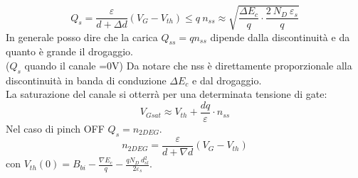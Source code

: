 \begin{equation}
    Q_s = \dfrac{\varepsilon}{d+\Delta d} (V_G - V_{th}) \leq q\ n_{ss} \approx \sqrt{\dfrac{\Delta E_c}{q} \cdot \dfrac{2\ N_D\ \varepsilon_s}{q}}
\end{equation}
In generale posso dire che la carica $Q_{ss}=qn_{ss}$ dipende dalla discontinuità e da quanto è grande il drogaggio.\\
($Q_s$ quando il canale =0V)
Da notare che nss è direttamente proporzionale alla discontinuità in banda di conduzione $\Delta E_c$ e dal drogaggio. \\
La saturazione del canale si otterrà per una determinata tensione di gate:
\begin{equation}
    V_{Gsat}\approx V_{th} + \dfrac{dq}{\varepsilon}\cdot n_{ss}
\end{equation}
 Nel caso di pinch OFF $Q_s=n_{2DEG}$.
 \begin{equation}
     n_{2DEG}=\dfrac{\varepsilon}{d+\nabla d}(V_G-V_{th})
 \end{equation}
 con $V_{th}(0)=B_{bi}-\frac{\nabla E_c}{q}-\frac{qN_D \ d_{sl}^2}{2\varepsilon_s}$.\\
 
